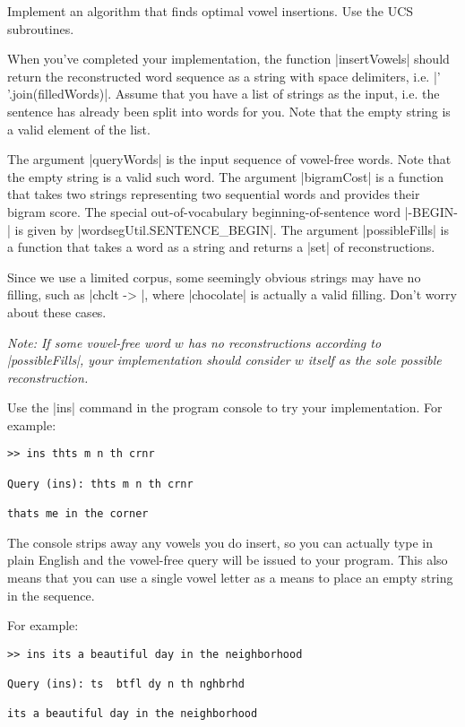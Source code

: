 \item {}
Implement an algorithm that finds optimal vowel insertions.  Use the UCS
subroutines.

When you've completed your implementation, the function |insertVowels| should
return the reconstructed word sequence as a string with space delimiters, i.e.
|' '.join(filledWords)|. Assume that you have a list of strings as the input,
i.e. the sentence has already been split into words for you. Note that the empty
string is a valid element of the list.

The argument |queryWords| is the input sequence of vowel-free words.  Note that
the empty string is a valid such word.  The argument |bigramCost| is a function
that takes two strings representing two sequential words and provides their
bigram score.  The special out-of-vocabulary beginning-of-sentence word
|-BEGIN-| is given by |wordsegUtil.SENTENCE_BEGIN|.  The argument
|possibleFills| is a function that takes a word as a string and returns a |set|
of reconstructions.

Since we use a limited corpus, some seemingly obvious strings may have no
filling, such as |chclt -> {}|, where |chocolate| is actually a valid filling.
Don't worry about these cases.

{\em Note: If some vowel-free word $w$ has no reconstructions according to
|possibleFills|, your implementation should consider $w$ itself as the sole
possible reconstruction.

Use the |ins| command in the program console to try your implementation.  For
example:

\begin{lstlisting}
>> ins thts m n th crnr

Query (ins): thts m n th crnr

thats me in the corner
\end{lstlisting}

The console strips away any vowels you do insert, so you can actually type in
plain English and the vowel-free query will be issued to your program.  This
also means that you can use a single vowel letter as a means to place an empty
string in the sequence.

For example:
\begin{lstlisting}
>> ins its a beautiful day in the neighborhood

Query (ins): ts  btfl dy n th nghbrhd

its a beautiful day in the neighborhood
\end{lstlisting}
}
